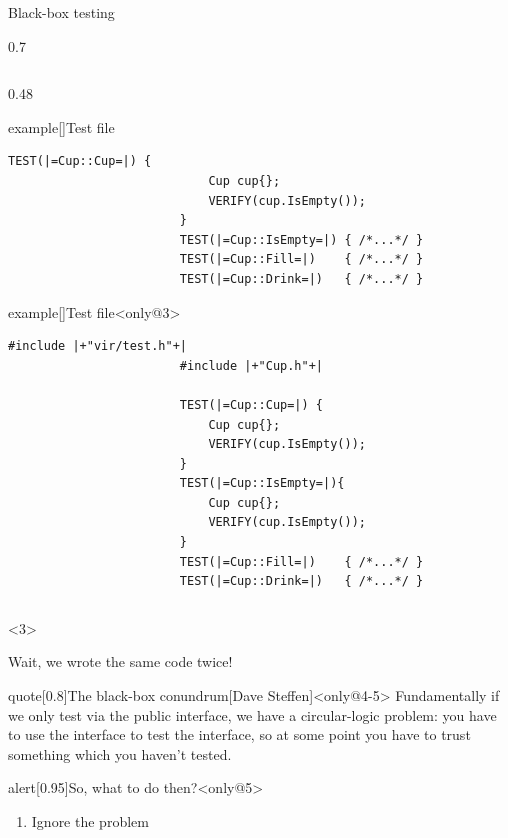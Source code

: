 \begin{frame}[fragile]{Black-box testing}
\begin{overlayarea}{\textwidth}{0.7\textheight}
\begin{columns}[T]
\begin{column}{0.48\textwidth}
\begin{varblock}{example}[\textwidth]{Test file}
\begin{lstlisting}[style=MyCpp]
                        TEST(|=Cup::Cup=|) {
                            Cup cup{};
                            VERIFY(cup.IsEmpty());
                        }
                        TEST(|=Cup::IsEmpty=|) { /*...*/ }
                        TEST(|=Cup::Fill=|)    { /*...*/ }
                        TEST(|=Cup::Drink=|)   { /*...*/ }
                    \end{lstlisting}
                \end{varblock}
                \begin{varblock}{example}[\textwidth]{Test file}<only@3>
                    \begin{lstlisting}[style=MyCpp]
                        #include |+"vir/test.h"+|
                        #include |+"Cup.h"+|

                        TEST(|=Cup::Cup=|) {
                            Cup cup{};
                            VERIFY(cup.IsEmpty());
                        }
                        TEST(|=Cup::IsEmpty=|){
                            Cup cup{};
                            VERIFY(cup.IsEmpty());
                        }
                        TEST(|=Cup::Fill=|)    { /*...*/ }
                        TEST(|=Cup::Drink=|)   { /*...*/ }
                    \end{lstlisting}
                \end{varblock}
            \end{column}
        \end{columns}
        \begin{onlyenv}<3>
            \begin{center}
                \alert{Wait, we wrote the same code twice!}
            \end{center}
        \end{onlyenv}
        \vspace{-3mm}
        \begin{varblock}{quote}[0.8\textwidth]{The black-box conundrum}[Dave Steffen]<only@4-5>
            Fundamentally if we only test via the public interface, we have a circular-logic problem: you have to use the interface to test the interface, so at some point you have to trust something which you haven't tested.
        \end{varblock}
        \begin{varblock}{alert}[0.95\textwidth]{So, what to do then?}<only@5>
            \begin{enumerate}
                \item Ignore the problem 

\end{enumerate}
\end{varblock}
\end{overlayarea}
\end{frame}
